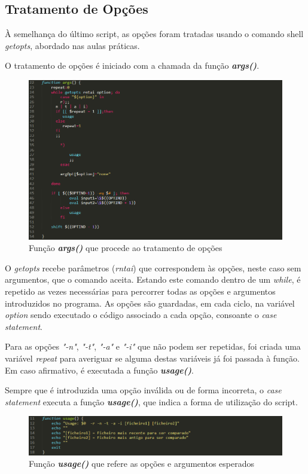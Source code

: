 \documentclass[10pt,portuguese]{article}
\begin{document}
\subsection{Tratamento de Opções}
À semelhança do último script, as opções foram tratadas usando o comando shell \textit{getopts}, abordado nas aulas práticas.
\newline
\par O tratamento de opções é iniciado com a chamada da função \textbf{\textit{args()}}.
\begin{figure}[!h]
    \centering
    \includegraphics[width=\textwidth]{comparestats/getopts_c.png}
    \caption{Função \textbf{\textit{args()}} que procede ao tratamento de opções}
\end{figure}
\par O \textit{getopts} recebe parâmetros (\textit{rntai}) que correspondem às opções, neste caso sem argumentos, que o comando aceita. Estando este comando dentro de um \textit{while}, é repetido as vezes necessárias para percorrer todas as opções e argumentos introduzidos no programa. As opções são guardadas, em cada ciclo, na variável \textit{option} sendo executado o código associado a cada opção, consoante o \textit{case statement}.
\par Para as opções \textit{"-n"}, \textit{"-t"}, \textit{"-a"} e \textit{"-i"} que não podem ser repetidas, foi criada uma variável \textit{repeat} para averiguar se alguma destas variáveis já foi passada à função. Em caso afirmativo, é executada a função \textbf{\textit{usage()}}.
\par Sempre que é introduzida uma opção inválida ou de forma incorreta, o \textit{case statement} executa a função \textbf{\textit{usage()}}, que indica a forma de utilização do script.
\begin{figure}[!h]
    \centering
    \includegraphics[width=\textwidth]{comparestats/usage_c.png}
    \caption{Função \textbf{\textit{usage()}} que refere as opções e argumentos esperados}
\end{figure}
\end{document}
